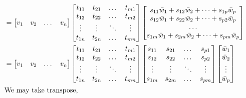 \begin{commentary}
\begin{align*}
	& = \begin{bmatrix} v_1 & v_2 & \dots & v_n  \end{bmatrix} \begin{bmatrix} t_{11} & t_{21} & \dots & t_{m1} \\ t_{12} & t_{22} & \dots & t_{m2} \\ \vdots & \vdots & \ddots & \vdots \\ t_{1n} & t_{2n} & \dots & t_{mn} \end{bmatrix} \begin{bmatrix} s_{11}\bar{w}_1+s_{12}\bar{w}_2+\dotsb+s_{1p}\bar{w}_p \\ s_{12}\bar{w}_1+s_{22}\bar{w}_2+\dotsb+s_{p2}\bar{w}_p \\ \dots \\ s_{1m}\bar{w}_1+ s_{2m}\bar{w}_2+\dotsb+s_{pm}\bar{w}_p \end{bmatrix} \\
	& = \begin{bmatrix} v_1 & v_2 & \dots & v_n  \end{bmatrix} \begin{bmatrix} t_{11} & t_{21} & \dots & t_{m1} \\ t_{12} & t_{22} & \dots & t_{m2} \\ \vdots & \vdots & \ddots & \vdots \\ t_{1n} & t_{2n} & \dots & t_{mn} \end{bmatrix} \begin{bmatrix} s_{11} & s_{21} & \dots & s_{p1} \\ s_{12} & s_{22} & \dots & s_{p2} \\ \vdots & \vdots & \ddots & \vdots \\ s_{1m} & s_{2m} & \dots & s_{pm} \end{bmatrix} \begin{bmatrix} \bar{w}_1 \\ \bar{w}_2 \\ \vdots \\ \bar{w}_p \end{bmatrix}\\
	\intertext{We may take transpose,}

\end{align*}
\end{commentary}

